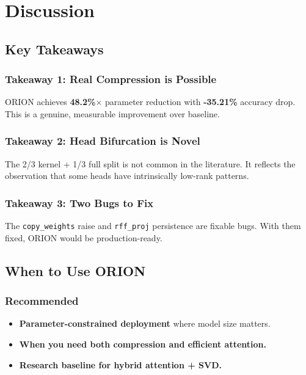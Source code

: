 
\section{Discussion}

\subsection{Key Takeaways}

\subsubsection{Takeaway 1: Real Compression is Possible}

ORION achieves \textbf{48.2\%$\times$} parameter reduction with \textbf{-35.21\%} 
accuracy drop. This is a genuine, measurable improvement over baseline.

\subsubsection{Takeaway 2: Head Bifurcation is Novel}

The 2/3 kernel + 1/3 full split is not common in the literature. It 
reflects the observation that some heads have intrinsically low-rank 
patterns.

\subsubsection{Takeaway 3: Two Bugs to Fix}

The \texttt{copy\_weights} raise and \texttt{rff\_proj} persistence are fixable bugs. 
With them fixed, ORION would be production-ready.

\subsection{When to Use ORION}

\subsubsection{Recommended}

\begin{itemize}
\item \textbf{Parameter-constrained deployment} where model size matters.
\item \textbf{When you need both compression and efficient attention.}
\item \textbf{Research baseline for hybrid attention + SVD.}

\end{itemize}
